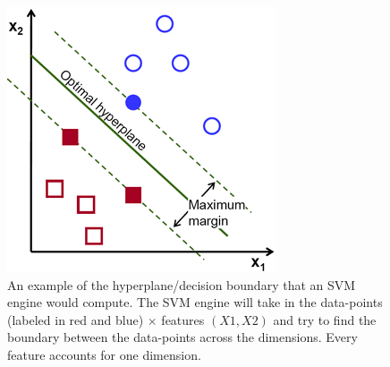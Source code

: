 \begin{figure}[!t]
 \begin{center}

\includegraphics[scale=2]{Chapter3/fig/optimal-hyperplane}
 \caption{An example of the hyperplane/decision boundary that an SVM engine would compute. The SVM engine will take in the data-points (labeled in red and blue) $\times$ features $(X1,X2)$ and try to find the boundary between the data-points across the dimensions. Every feature accounts for one dimension.}
 \label{fig:SVM}
 \end{center}
 \end{figure}
 

